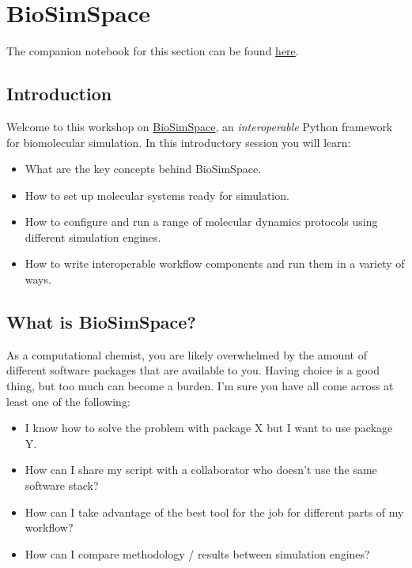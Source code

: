 
\hypertarget{biosimspace}{%
\section{BioSimSpace}\label{biosimspace}}

The companion notebook for this section can be found
\href{https://github.com/michellab/BioSimSpaceTutorials/blob/4844562e7d2cd0b269cead56562ec16a3dfaef7c/01_introduction/01_introduction.ipynb}{here}.

\hypertarget{introduction}{%
\subsection{Introduction}\label{introduction}}

Welcome to this workshop on \href{https://biosimspace.org}{BioSimSpace},
an \emph{interoperable} Python framework for biomolecular simulation. In
this introductory session you will learn:

\begin{itemize}
\tightlist
\item
  What are the key concepts behind BioSimSpace.
\item
  How to set up molecular systems ready for simulation.
\item
  How to configure and run a range of molecular dynamics protocols using
  different simulation engines.
\item
  How to write interoperable workflow components and run them in a
  variety of ways.
\end{itemize}

\hypertarget{what-is-biosimspace}{%
\subsection{What is BioSimSpace?}\label{what-is-biosimspace}}

As a computational chemist, you are likely overwhelmed by the amount of
different software packages that are available to you. Having choice is
a good thing, but too much can become a burden. I'm sure you have all
come across at least one of the following:

\begin{itemize}
\tightlist
\item
  I know how to solve the problem with package X but I want to use
  package Y.
\item
  How can I share my script with a collaborator who doesn't use the same
  software stack?
\item
  How can I take advantage of the best tool for the job for different
  parts of my workflow?
\item
  How can I compare methodology / results between simulation engines?
\end{itemize}

